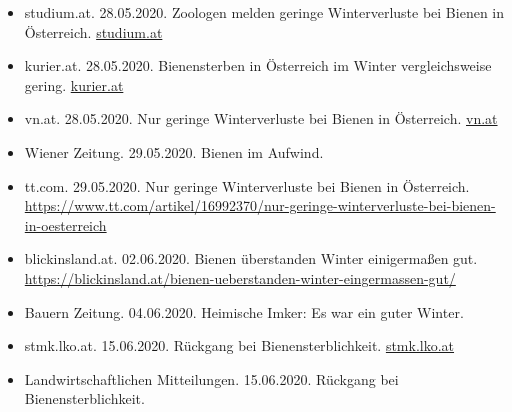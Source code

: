 \begin{itemize}
    \item
    studium.at. 28.05.2020. Zoologen melden geringe Winterverluste bei Bienen in Österreich. \href{https://www.studium.at/zoologen-melden-geringe-winterverluste-bei-bienen-oesterreich}{studium.at}
    
    \item
    kurier.at. 28.05.2020. Bienensterben in Österreich im Winter vergleichsweise gering. \href{https://kurier.at/chronik/oesterreich/bienensterben-in-oesterreich-im-winter-vergleichsweise-gering/400854374}{kurier.at}
    
    \item
    vn.at. 28.05.2020. Nur geringe Winterverluste bei Bienen in Österreich. \href{https://www.vn.at/newsticker/nur-geringe-winterverluste-bei-bienen-in-oesterreich/1852978}{vn.at}
    
    \item
    Wiener Zeitung. 29.05.2020. Bienen im Aufwind.
    
    \item
    tt.com. 29.05.2020. Nur geringe Winterverluste bei Bienen in Österreich. \url{https://www.tt.com/artikel/16992370/nur-geringe-winterverluste-bei-bienen-in-oesterreich}
    
    \item
    blickinsland.at. 02.06.2020. Bienen überstanden Winter einigermaßen gut. \url{https://blickinsland.at/bienen-ueberstanden-winter-eingermassen-gut/}
    
    \item
    Bauern Zeitung. 04.06.2020. Heimische Imker: Es war ein guter Winter. 
    
    \item
    stmk.lko.at. 15.06.2020. Rückgang bei Bienensterblichkeit.
    \href{https://stmk.lko.at/landwirtschaftliche-mitteilungen-vom-15-juni-2020+2500+3228498}{stmk.lko.at}
    
    \item
    Landwirtschaftlichen Mitteilungen. 15.06.2020. Rückgang bei Bienensterblichkeit.


\end{itemize}